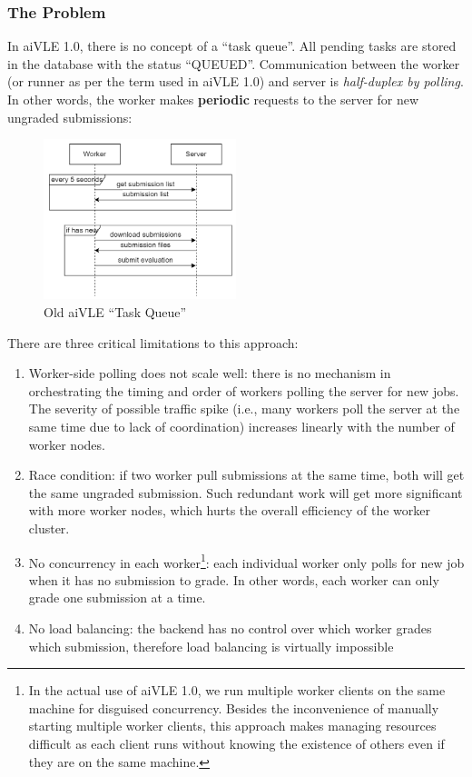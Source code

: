 \subsubsection{The Problem}
In aiVLE 1.0, there is no concept of a ``task queue''. All pending tasks are stored in the database with the status ``QUEUED''. Communication between the worker (or runner as per the term used in aiVLE 1.0) and server is \textit{half-duplex by polling}. In other words, the worker makes \textbf{periodic} requests to the server for new ungraded submissions:
\begin{figure}[H]
    \centering
    \includegraphics[width=0.5\textwidth]{images/aivle-web-old-task-queue.png}
    \caption{Old aiVLE ``Task Queue''}
    \label{fig:aivle-web-old-task-queue}
\end{figure}
There are three critical limitations to this approach:
\begin{enumerate}
    \item Worker-side polling does not scale well: there is no mechanism in orchestrating the timing and order of workers polling the server for new jobs. The severity of possible traffic spike (i.e., many workers poll the server at the same time due to lack of coordination) increases linearly with the number of worker nodes.
    \item Race condition: if two worker pull submissions at the same time, both will get the same ungraded submission. Such redundant work will get more significant with more worker nodes, which hurts the overall efficiency of the worker cluster.
    \item No concurrency in each worker\footnote{In the actual use of aiVLE 1.0, we run multiple worker clients on the same machine for disguised concurrency. Besides the inconvenience of manually starting multiple worker clients, this approach makes managing resources difficult as each client runs without knowing the existence of others even if they are on the same machine.\label{fn:worker-disguised-concurrency}}: each individual worker only polls for new job when it has no submission to grade. In other words, each worker can only grade one submission at a time.
    \item No load balancing: the backend has no control over which worker grades which submission, therefore load balancing is virtually impossible
\end{enumerate}

